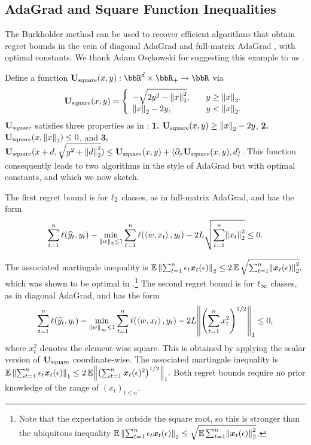 \subsection{AdaGrad and Square Function Inequalities}
\label{sec:adagrad}

The Burkholder method can be used to recover efficient algorithms that obtain regret bounds in the vein of diagonal AdaGrad and full-matrix AdaGrad \citep{duchi2011adaptive}, with optimal constants. We thank Adam Os\k{e}kowski for suggesting this example to us \citep{osekowski2017personal}.

Define a function $\burk_{\textrm{square}}(x, y):\bbR^{d}\times{}\bbR_{+}\to\bbR$  \citep{osekowski2005two,osekowski2012sharp} via
\[
\burk_{\textrm{square}}(x, y) = \left\{
\begin{array}{ll}
-\sqrt{2y^{2} - \nrm*{x}_{2}^{2}},\quad& y\geq{}\nrm*{x}_{2}. \\
\nrm*{x}_{2}-2y,\quad& y<\nrm*{x}_{2}.
\end{array}
\right.
\]
$\burk_{\textrm{square}}$ satisfies three properties as in : \textbf{1.} $\burk_{\textrm{square}}(x,y)\geq{}\nrm*{x}_{2}-2y$, \textbf{2.} $\burk_{\textrm{square}}(x,\nrm*{x}_{2})\leq{}0$, and \textbf{3.} $\burk_{\textrm{square}}(x+d,\sqrt{y^2 + \nrm*{d}_{2}^{2}})\leq{} \burk_{\textrm{square}}(x,y) + \tri*{\partial_{x}\burk_{\textrm{square}}(x,y), d}$. This function consequently leads to two algorithms in the style of AdaGrad \citep{duchi2011adaptive} but with optimal constants, and which we now sketch.

The first regret bound is for $\ls_{2}$ classes, as in full-matrix AdaGrad, and has the form
\[
\sum_{t=1}^n\loss(\pred_t,y_t) - \min_{\norm{w}_{2}\leq 1}\sum_{t=1}^n \loss(\inner{w,x_t},y_t) - 2L\sqrt{\sum_{t=1}^{n}\nrm*{x_t}^{2}_{2}}\leq{}0.
\]

The associated martingale inequality is 
$
\En\norm{\sum_{t=1}^n \epsilon_t\bx_t(\epsilon)}_{2} \leq{} 2\En\sqrt{\sum_{t=1}^{n}\nrm*{\bx_{t}(\eps)}^{2}_{2}},
$
which was shown to be optimal in \cite{osekowski2005two}.\footnote{Note that the expectation is outside the square root, so this is stronger than the ubiquitous inequality $\En\norm{\sum_{t=1}^n \epsilon_t\bx_t(\epsilon)}_{2} \leq{} \sqrt{\En\sum_{t=1}^{n}\nrm*{\bx_{t}(\eps)}^{2}_{2}}$.} The second regret bound is for $\ls_{\infty}$ classes, as in diagonal AdaGrad, and has the form
\[
\sum_{t=1}^n\loss(\pred_t,y_t) - \min_{\norm{w}_{\infty}\leq 1}\sum_{t=1}^n \loss(\inner{w,x_t},y_t) - 2L\nrm*{\prn*{\sum_{t=1}^{n}x_{t}^{2}}^{1/2}}_{1}\leq{}0,
\]
where $x_{t}^{2}$ denotes the element-wise square. This is obtained by applying the scalar version of $\burk_{\textrm{square}}$ coordinate-wise. The associated martingale inequality is 
$
\En\norm{\sum_{t=1}^n \epsilon_t\bx_t(\epsilon)}_{1} \leq{} 2\En\nrm*{\prn*{\sum_{t=1}^{n}\bx_{t}(\eps)^{2}}^{1/2}}_{1}.
$
Both regret bounds require no prior knowledge of the range of $(x_t)_{t\leq{}n}$.

